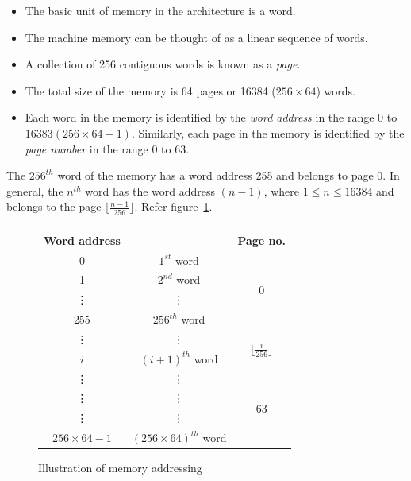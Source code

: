 
\begin{itemize}
	\item The basic unit of memory in the \ESIM architecture is a word. 
	\item The machine memory can be thought of as a linear sequence of words.
	\item A collection of 256 contiguous words is known as a \emph{page}. 
	\item The total size of the memory is 64 pages or 16384 ($256 \times 64$) words.
	\item Each word in the memory is identified by the \emph{word address} in the range 0 to $16383(256 \times 64 - 1)$. Similarly, each page in the memory is identified by the \emph{page number}  in the range 0 to 63.
\end{itemize}

\begin{example}
	The $256^{th}$ word of the memory has a word address 255 and belongs to page 0. In general, the $n^{th}$ word has the word address $(n-1)$, where  $1 \le n \le 16384$ and belongs to the page $\lfloor \frac{n-1}{256} \rfloor$. Refer figure~\ref{fig:mem_struct}. 
\end{example}

\begin{figure}[htp!] \small
	\centering
	\begin{tabular}{c|c|c|} 
		\multicolumn{3}{c}{} \\
		\textbf{Word address} &  & \textbf{Page no.} \\ \cline{2-3}
		0 & $1^{st}$ word & \multirow{4}{*}{$0$} \\ \cline{2-2}
		1 & $2^{nd}$ word &  \\ \cline{2-2}
		\vdots & \vdots & \\ \cline{2-2}
		255 & $256^{th}$ word &  \\ \cline{2-3}
	
		\vdots & \vdots & \multirow{2}{*}{$\lfloor \frac{i}{256} \rfloor $} \\ \cline{2-2}
		$i$ & $(i+1)^{th} $ word &  \\ \cline{2-2}
		\vdots &\vdots &  \\ \cline{2-3}
	
		\vdots & \vdots & \multirow{2}{*}{$63$} \\ \cline{2-2}
		\vdots &\vdots &  \\ \cline{2-2}
		$256 \times 64 - 1$ & $(256 \times 64)^{th} $ word &  \\ \cline{2-3}
	\end{tabular}
	\caption{Illustration of memory addressing}
	\label{fig:mem_struct}
\end{figure}


